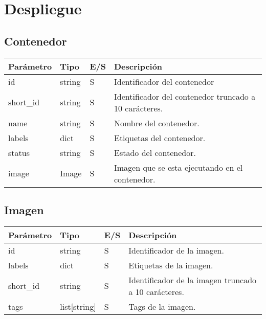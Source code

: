 \section{Despliegue}

	\subsection{Contenedor}
		\begin{table}[h!]
			\centering
	\begin{adjustbox}{max width=\textwidth}
			\begin{tabular}{|l|l|l|l|}
				\hline
				Parámetro & Tipo & E/S & Descripción \\ \hline
				id & string & S & Identificador del contenedor \\ \hline
				short\_id & string & S & Identificador del contenedor truncado a 10 carácteres. \\ \hline
				name & string & S & Nombre del contenedor. \\ \hline
				labels & dict & S & Etiquetas del contenedor. \\ \hline
				status & string & S & Estado del contenedor. \\ \hline
				image & Image & S & Imagen que se esta ejecutando en el contenedor. \\ \hline
			\end{tabular}
\end{adjustbox}
		\end{table}
	
	\subsection{Imagen}
		\begin{table}[h!]
			\centering
	\begin{adjustbox}{max width=\textwidth}
			\begin{tabular}{|l|l|l|l|}
				\hline
				Parámetro & Tipo & E/S & Descripción \\ \hline
				id & string & S & Identificador de la imagen. \\ \hline
				labels & dict & S & Etiquetas de la imagen. \\ \hline
				short\_id & string & S & Identificador de la imagen truncado a 10 carácteres. \\ \hline
				tags & list[string] & S & Tags de la imagen. \\ \hline
			\end{tabular}
\end{adjustbox}
		\end{table}
	
